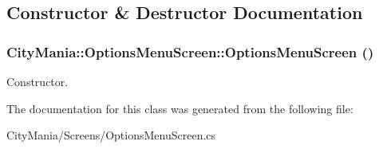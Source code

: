 \subsection{Constructor \& Destructor Documentation}
\hypertarget{classCityMania_1_1OptionsMenuScreen_aa739d5914c1ecd766a0ae98e83ca2f1a}{
\subsubsection[{OptionsMenuScreen}]{\setlength{\rightskip}{0pt plus 5cm}CityMania::OptionsMenuScreen::OptionsMenuScreen ()}}
\label{classCityMania_1_1OptionsMenuScreen_aa739d5914c1ecd766a0ae98e83ca2f1a}


Constructor. 

The documentation for this class was generated from the following file:\begin{DoxyCompactItemize}
\item 
CityMania/Screens/OptionsMenuScreen.cs\end{DoxyCompactItemize}
